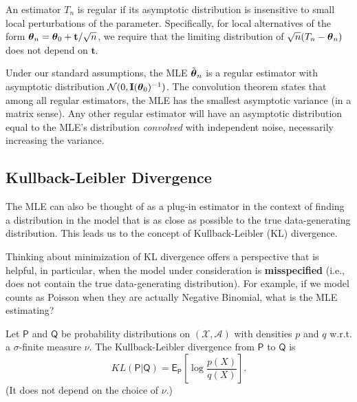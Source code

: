 \begin{definition}
An estimator $T_n$ is regular if its asymptotic distribution is insensitive to small local perturbations of the parameter. Specifically, for local alternatives of the form $\boldsymbol{\theta}_n = \boldsymbol{\theta}_0 + \mathbf{t}/\sqrt{n}$, we require that the limiting distribution of $\sqrt{n}(T_n - \boldsymbol{\theta}_n)$ does not depend on $\mathbf{t}$.
\end{definition}

Under our standard assumptions, the MLE $\tilde{\boldsymbol{\theta}}_n$ is a regular estimator with asymptotic distribution $\mathcal{N}(0, \mathbf{I}(\boldsymbol{\theta}_0)^{-1})$. The convolution theorem states that among all regular estimators, the MLE has the smallest asymptotic variance (in a matrix sense). Any other regular estimator will have an asymptotic distribution equal to the MLE's distribution \textit{convolved} with independent noise, necessarily increasing the variance.

\subsection{Kullback-Leibler Divergence}
\label{sub:Kullback-Leibler Divergence}

The MLE can also be thought of as a plug-in estimator in the context of finding a distribution in the model that is as close as possible to the true data-generating distribution. This leads us to the concept of Kullback-Leibler (KL) divergence.

\begin{remark}
    Thinking about minimization of KL divergence offers a perspective that is helpful, in particular, when the model under consideration is \textbf{misspecified} (i.e., does not contain the true data-generating distribution). For example, if we model counts as Poisson when they are actually Negative Binomial, what is the MLE estimating?
\end{remark}

\begin{definition}
    Let $\mathsf{P}$ and $\mathsf{Q}$ be probability distributions on $(\mathcal{X}, \mathcal{A})$ with densities $p$ and $q$ w.r.t. a $\sigma$-finite measure $\nu$. The Kullback-Leibler divergence from $\mathsf{P}$ to $\mathsf{Q}$ is
    \begin{equation*}
        KL(\mathsf{P}|\mathsf{Q}) = \mathsf{E}_{\mathsf{P}}\left[\log\frac{p(X)}{q(X)}\right]. \label{eq:KL_def}
    \end{equation*}
    (It does not depend on the choice of $\nu$.)
\end{definition}

